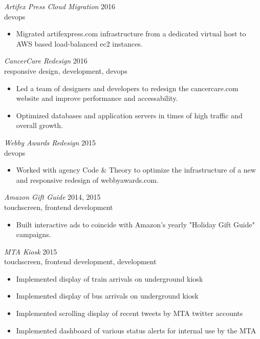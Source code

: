 \documentclass[line,margin]{res}
\begin{document}
\begin{resume}
    {\sl Artifex Press Cloud Migration}
    \hfill 2016 \\
    devops
    \begin{itemize} \itemsep -2pt
        \item
            Migrated artifexpress.com infrastructure from a dedicated virtual host to
            AWS based load-balanced ec2 instances.
    \end{itemize}

    {\sl CancerCare Redesign}
    \hfill 2016 \\
    responsive design, development, devops
    \begin{itemize} \itemsep -2pt
        \item
            Led a team of designers and developers to redesign the cancercare.com website
            and improve performance and accessability.
        \item
            Optimized databases and application servers in times of high traffic and overall
            growth.
    \end{itemize}

    {\sl Webby Awards Redesign}
    \hfill 2015 \\
    devops
    \begin{itemize} \itemsep -2pt
        \item
            Worked with agency Code \& Theory to optimize the infrastructure of a new and responsive
            redesign of webbyawards.com.
    \end{itemize}

    \begin{samepage}
    {\sl Amazon Gift Guide}
    \hfill 2014, 2015 \\
    touchscreen, frontend development
    \begin{itemize} \itemsep -2pt
        \item
            Built interactive ads to coincide with Amazon's yearly "Holiday Gift Guide" campaigns.
    \end{itemize}
    \end{samepage}

    {\sl MTA Kiosk}
    \hfill 2015 \\
    touchscreen, frontend development, development
    \begin{itemize} \itemsep -2pt
        \item
            Implemented display of train arrivals on underground kiosk
        \item
            Implemented display of bus arrivals on underground kiosk
        \item
            Implemented scrolling display of recent tweets by MTA twitter accounts
        \item
            Implemented dashboard of various status alerts for internal use by the MTA
    \end{itemize}


\end{resume}
\end{document}
